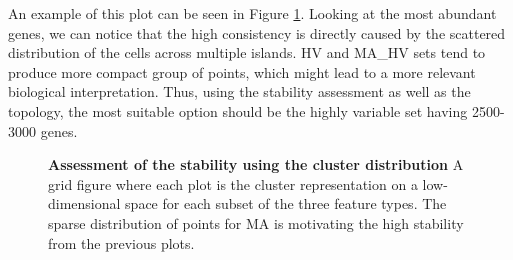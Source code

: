 An example of this plot can be seen in Figure \ref{fig:ca-feat-cluster}. Looking at the most abundant genes, we can notice that the high consistency is directly caused by the scattered distribution of the cells across multiple islands. HV and MA\_HV sets tend to produce more compact group of points, which might lead to a more relevant biological interpretation. Thus, using the stability assessment as well as the topology, the most suitable option should be the highly variable set having 2500-3000 genes.

\begin{figure}[H]
    \centering
    \caption{\label{fig:ca-feat-cluster}\textbf{Assessment of the stability using the cluster distribution} A grid figure where each plot is the cluster representation on a low-dimensional space for each subset of the three feature types. The sparse distribution of points for MA is motivating the high stability from the previous plots. }
\end{figure}

